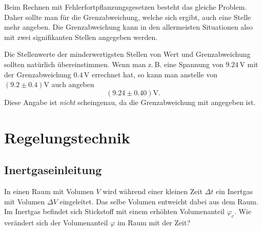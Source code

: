 \documentclass[a4paper,10pt,fleqn,twocolumn,twoside]{scrartcl}
\numberwithin{equation}{section}
\begin{document}
Beim Rechnen mit Fehlerfortpflanzungsgesetzen besteht das gleiche
Problem. Daher sollte man für die Grenzabweichung, welche sich ergibt,
auch eine Stelle mehr angeben. Die Grenzabweichung kann in den
allermeisten Situationen also mit zwei signifikanten Stellen angegeben
werden.

Die Stellenwerte der minderwertigsten Stellen von Wert und
Grenzabweichung sollten natürlich übereinstimmen.
Wenn man z.\,B. eine Spannung von $9.24\,\mathrm V$ mit der
Grenzabweichung $0.4\,\mathrm V$ errechnet hat, so kann man
anstelle von $(9.2\pm 0.4)\mathrm V$ auch angeben
\begin{equation}
(9.24\pm 0.40)\mathrm V.
\end{equation}
Diese Angabe ist \textit{nicht} scheingenau, da die Grenzabweichung
mit angegeben ist.

\newpage
\section{Regelungstechnik}
\subsection{Inertgaseinleitung}
In einen Raum mit Volumen $V$ wird während einer kleinen
Zeit $\Delta t$ ein Inertgas mit Volumen $\Delta V$ eingeleitet.
Das selbe Volumen entweicht dabei aus dem Raum. Im Inertgas
befindet sich Stickstoff mit einem erhöhten Volumenanteil $\varphi_c$.
Wie verändert sich der Volumenanteil $\varphi$ im Raum mit der Zeit?
\end{document}
